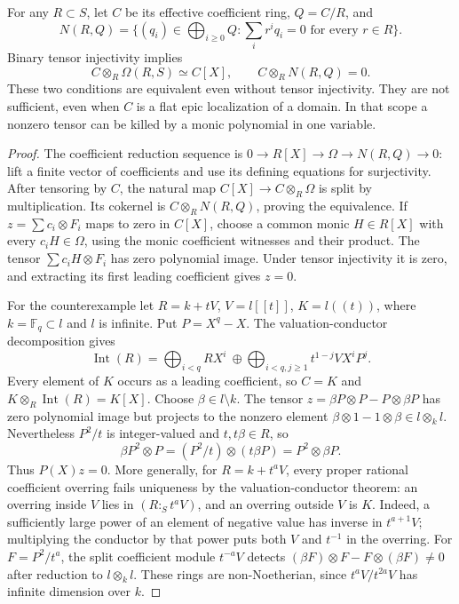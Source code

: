 \begin{proposition}\label{prop:coefficient-basechange-not-sufficient}
For any $R\subset S$, let $C$ be its effective coefficient ring,
$Q=C/R$, and
\[
 N(R,Q)=\{(q_i)\in\bigoplus_{i\ge0}Q:
                         \sum_i r^iq_i=0\text{ for every }r\in R\}.
\]
Binary tensor injectivity implies
\[
 C\otimes_R\Omega(R,S)\simeq C[X],\qquad
 C\otimes_RN(R,Q)=0.
\]
These two conditions are equivalent even without tensor injectivity.
They are not sufficient, even when $C$ is a flat epic localization
of a domain. In that scope a nonzero tensor can be killed by a
monic polynomial in one variable.
\end{proposition}
\begin{proof}
The coefficient reduction sequence is
$0\to R[X]\to\Omega\to N(R,Q)\to0$: lift a finite vector of
coefficients and use its defining equations for surjectivity.
After tensoring by $C$, the natural map $C[X]\to C\otimes_R\Omega$
is split by multiplication. Its cokernel is $C\otimes_RN(R,Q)$,
proving the equivalence.
If $z=\sum c_i\otimes F_i$ maps to zero in $C[X]$, choose a common
monic $H\in R[X]$ with every $c_iH\in\Omega$, using the monic
coefficient witnesses and their product. The tensor
$\sum c_iH\otimes F_i$ has zero polynomial image. Under tensor
injectivity it is zero, and extracting its first leading
coefficient gives $z=0$.

For the counterexample let $R=k+tV$, $V=l[[t]]$, $K=l((t))$,
where $k=\mathbb F_q\subset l$ and $l$ is infinite. Put $P=X^q-X$.
The valuation-conductor decomposition gives
\[
 \operatorname{Int}(R)=\bigoplus_{i<q}RX^i\ \oplus\!
 \bigoplus_{i<q,j\ge1}t^{1-j}VX^iP^j.
\]
Every element of $K$ occurs as a leading coefficient, so $C=K$
and $K\otimes_R\operatorname{Int}(R)=K[X]$.
Choose $\beta\in l\setminus k$. The tensor
$z=\beta P\otimes P-P\otimes\beta P$ has zero polynomial
image but projects to the nonzero element
$\beta\otimes1-1\otimes\beta\in l\otimes_kl$.
Nevertheless $P^2/t$ is integer-valued and $t,t\beta\in R$, so
\[
 \beta P^2\otimes P=(P^2/t)\otimes(t\beta P)
                         =P^2\otimes\beta P.
\]
Thus $P(X)z=0$.
More generally, for $R=k+t^aV$, every proper rational coefficient
overring fails uniqueness by the valuation-conductor theorem:
an overring inside $V$ lies in $(R:_S t^aV)$, and an overring
outside $V$ is $K$. Indeed, a sufficiently large power of an
element of negative value has inverse in $t^{a+1}V$; multiplying
the conductor by that power puts both $V$ and $t^{-1}$ in the
overring. For $F=P^2/t^a$, the split coefficient module
$t^{-a}V$ detects
$(\beta F)\otimes F-F\otimes(\beta F)\ne0$ after reduction to
$l\otimes_kl$. These rings are non-Noetherian, since
$t^aV/t^{2a}V$ has infinite dimension over $k$.
\end{proof}

